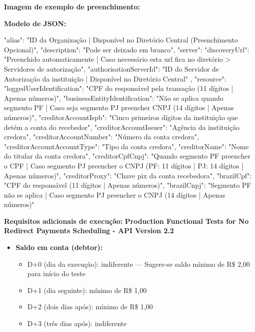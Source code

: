 \textbf{Imagem de exemplo de preenchimento:}

\begin{figure}[H]
    \centering
    \label{fig:enrollmentslonga}
\end{figure}

\textbf{Modelo de JSON:}

\begin{codeblock}
{
    "alias": "ID da Organização | Disponível no Diretório Central (Preenchimento Opcional)",
    "description": "Pode ser deixado em branco",
    "server": {
        "discoveryUrl": "Preenchido automaticamente | Caso necessário esta url fica no diretório > Servidores de autorização",
        "authorisationServerId": "ID do Servidor de Autorização da instituição | Disponível no Diretório Central"
    },
    "resource": {
        "loggedUserIdentification": "CPF do responsável pela transação (11 dígitos | Apenas números)",
        "businessEntityIdentification": "Não se aplica quando segmento PF | Caso seja segmento PJ preencher CNPJ (14 dígitos | Apenas números)",
        "creditorAccountIspb": "Cinco primeiros dígitos da instituição que detém a conta do recebedor",
        "creditorAccountIssuer": "Agência da instituição credora",
        "creditorAccountNumber": "Número da conta credora",
        "creditorAccountAccountType": "Tipo da conta credora",
        "creditorName": "Nome do titular da conta credora",
        "creditorCpfCnpj": "Quando segmento PF preencher o CPF | Caso segmento PJ preencher o CNPJ (PF: 11 dígitos | PJ: 14 dígitos | Apenas números)",
        "creditorProxy": "Chave pix da conta recebedora",
        "brazilCpf": "CPF do responsável (11 dígitos | Apenas números)",
        "brazilCnpj": "Segmento PF não se aplica | Caso segmento PJ preencher o CNPJ (14 dígitos | Apenas números)"
    }
}
\end{codeblock}

\medskip
\textbf{Requisitos adicionais de execução:}
\medskip
\textbf{Production Functional Tests for No Redirect Payments Scheduling - API Version 2.2}
\begin{itemize}
    \item \textbf{Saldo em conta (debtor):}
    \begin{itemize}
        \item D+0 (dia da execução): indiferente — Sugere-se saldo mínimo de R\$ 2,00 para início do teste
        \item D+1 (dia seguinte): mínimo de R\$ 1,00
        \item D+2 (dois dias após): mínimo de R\$ 1,00
        \item D+3 (três dias após): indiferente
    \end{itemize}
\end{itemize}

